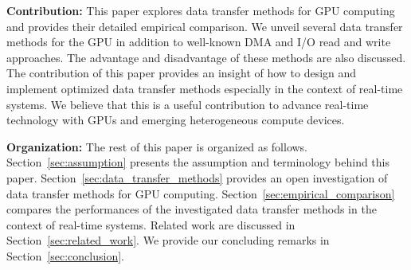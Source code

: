 \textbf{Contribution:}
This paper explores data transfer methods for GPU computing and
provides their detailed empirical comparison.
We unveil several data transfer methods for the GPU in addition to
well-known DMA and I/O read and write approaches.
The advantage and disadvantage of these methods are also discussed.
The contribution of this paper provides an insight of how to design and
implement optimized data transfer methods especially in the context of
real-time systems.
We believe that this is a useful contribution to advance real-time
technology with GPUs and emerging heterogeneous compute devices.

\textbf{Organization:}
The rest of this paper is organized as follows.
Section~\ref{sec:assumption} presents the assumption and terminology
behind this paper.
Section~\ref{sec:data_transfer_methods} provides an open investigation
of data transfer methods for GPU computing.
Section~\ref{sec:empirical_comparison} compares the performances of the
investigated data transfer methods in the context of real-time systems.
Related work are discussed in Section~\ref{sec:related_work}.
We provide our concluding remarks in Section~\ref{sec:conclusion}.
